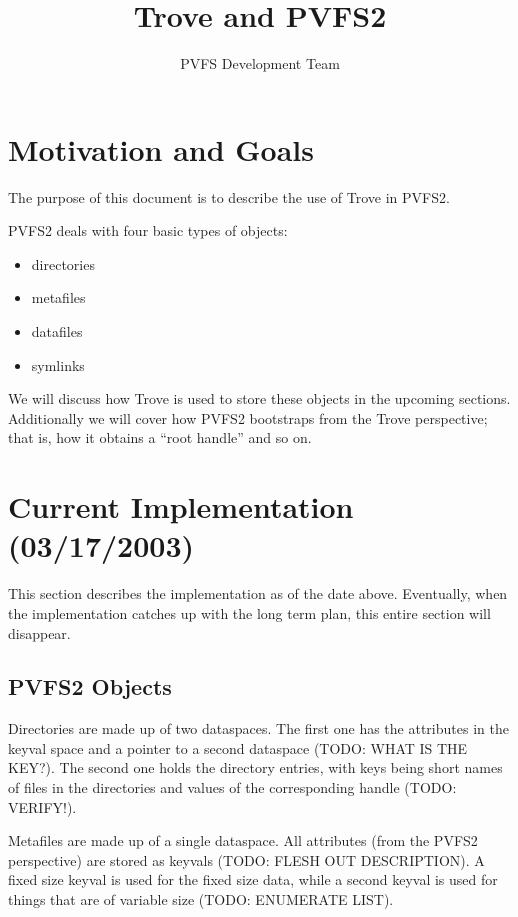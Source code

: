 \documentclass[10pt]{article} %
\title{Trove and PVFS2}
\author{PVFS Development Team}
\begin{document}
\maketitle

\section{Motivation and Goals}

The purpose of this document is to describe the use of Trove in PVFS2.

PVFS2 deals with four basic types of objects:
\begin{itemize}
\item directories
\item metafiles
\item datafiles
\item symlinks
\end{itemize}

We will discuss how Trove is used to store these objects in the upcoming
sections.  Additionally we will cover how PVFS2 bootstraps from the Trove
perspective; that is, how it obtains a ``root handle'' and so on.

\section{Current Implementation (03/17/2003)}

This section describes the implementation as of the date above.  Eventually,
when the implementation catches up with the long term plan, this entire
section will disappear.

\subsection{PVFS2 Objects}

Directories are made up of two dataspaces.  The first one has the attributes
in the keyval space and a pointer to a second dataspace (TODO: WHAT IS THE
KEY?).  The second one holds the directory entries, with keys being short
names of files in the directories and values of the corresponding handle
(TODO: VERIFY!).

Metafiles are made up of a single dataspace.  All attributes (from the PVFS2
perspective) are stored as keyvals (TODO: FLESH OUT DESCRIPTION).  A fixed
size keyval is used for the fixed size data, while a second keyval is used for
things that are of variable size (TODO: ENUMERATE LIST).
\end{document}
